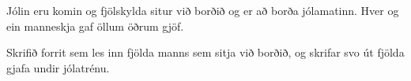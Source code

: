 \begin{problem}
	Jólin eru komin og fjölskylda situr við borðið og er að borða jólamatinn.
	Hver og ein manneskja gaf öllum öðrum gjöf.
	
	Skrifið forrit sem les inn fjölda manns sem sitja við borðið, og skrifar svo út fjölda gjafa undir jólatrénu.

\begin{example}
%
\end{example}
\begin{example}
%
\end{example}
\begin{example}
%	
\end{example}
\end{problem}